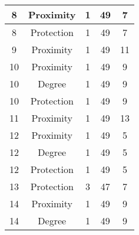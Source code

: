 \documentclass[results.tex]{subfiles}
\begin{document}
\begin{center}
\begin{tabular}{| c || c | c | c | c |}
            \hline
            8                       & Proximity                    & 1                      & 49                      & 7                    \\
            \hline
            8                       & Protection                   & 1                      & 49                      & 7                    \\
            \hline
            9                       & Proximity                    & 1                      & 49                      & 11                   \\
            \hline
            10                      & Proximity                    & 1                      & 49                      & 9                    \\
            \hline
            10                      & Degree                       & 1                      & 49                      & 9                    \\
            \hline
            10                      & Protection                   & 1                      & 49                      & 9                    \\
            \hline
            11                      & Proximity                    & 1                      & 49                      & 13                   \\
            \hline
            12                      & Proximity                    & 1                      & 49                      & 5                    \\
            \hline
            12                      & Degree                       & 1                      & 49                      & 5                    \\
            \hline
            12                      & Protection                   & 1                      & 49                      & 5                    \\
            \hline
            13                      & Protection                   & 3                      & 47                      & 7                    \\
            \hline
            14                      & Proximity                    & 1                      & 49                      & 9                    \\
            \hline
            14                      & Degree                       & 1                      & 49                      & 9                    \\

\end{tabular}
\end{center}
\end{document}
